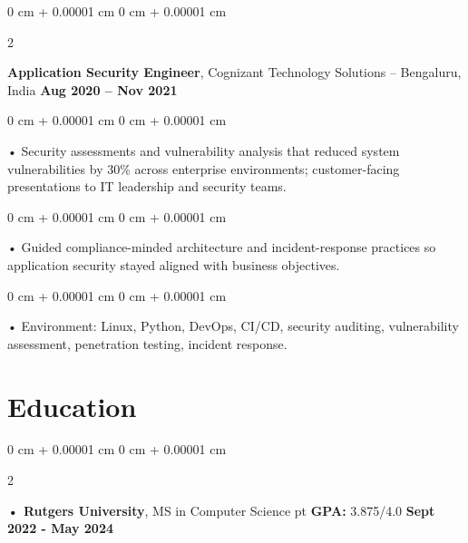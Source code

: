 \documentclass[10pt, letterpaper]{article}
\newenvironment{onecolentry}{
    \begin{adjustwidth}{
        0 cm + 0.00001 cm
    }{
        0 cm + 0.00001 cm
    }
}{
    \end{adjustwidth}
} %
\newenvironment{twocolentry}[2][]{
    \onecolentry
    \def\secondColumn{#2}
    \setcolumnwidth{\fill, 4.5 cm}
    \begin{paracol}{2}
}{
    \switchcolumn \raggedleft \secondColumn
    \end{paracol}
    \endonecolentry
} %
\begin{document}
        \begin{twocolentry}{
            \textbf{Aug 2020 – Nov 2021}
        }
            \vspace{2 pt }
            \textbf{Application Security Engineer}, Cognizant Technology Solutions -- Bengaluru, India\end{twocolentry}
        \begin{onecolentry}
             • Security assessments and vulnerability analysis that reduced system vulnerabilities by 30\% across enterprise environments; customer-facing presentations to IT leadership and security teams.
        \end{onecolentry}
        \begin{onecolentry}
             • Guided compliance-minded architecture and incident-response practices so application security stayed aligned with business objectives.
        \end{onecolentry}
        \begin{onecolentry}
             • Environment: Linux, Python, DevOps, CI/CD, security auditing, vulnerability assessment, penetration testing, incident response.
        \end{onecolentry}
    \vspace{2 pt }
        \section{Education}
        \vspace{2 pt }
        \begin{twocolentry}{
            \textbf{Sept 2022 - May 2024}
        }
            \textbf{ • Rutgers University}, MS in Computer Science  pt \textbf{GPA:} 3.875/4.0  \end{twocolentry}
\end{document}
